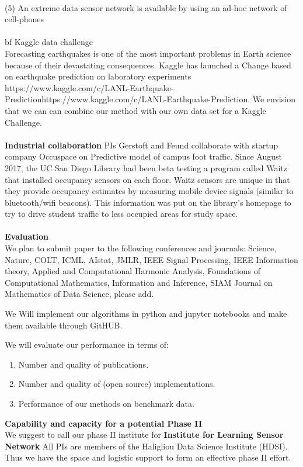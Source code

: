 \documentclass{article}
\begin{document}
\\
(5) An extreme data sensor network is available by using an ad-hoc network of cell-phones
\\
\\
{bf Kaggle data challenge}\\
Forecasting earthquakes is one of the most important problems in Earth science because of their devastating consequences. Kaggle has launched a Change based on earthquake prediction on laboratory experiments {https://www.kaggle.com/c/LANL-Earthquake-Prediction}{https://www.kaggle.com/c/LANL-Earthquake-Prediction}. We envision that we can can combine our method with our own data set for a Kaggle Challenge.  
\\
\\
{\bf Industrial collaboration}
PIs Gerstoft and Feund collaborate with startup company  Occuspace on
Predictive model of campus foot traffic. Since August 2017, the UC San Diego Library had been beta testing a program called Waitz that installed occupancy sensors on each floor. Waitz sensors are unique in that they provide occupancy estimates by measuring mobile device signals (similar to bluetooth/wifi beacons). This information was put on the library’s homepage to try to drive student traffic to less occupied areas for study space. 
\\
\\
{\bf Evaluation}\\
We plan to submit paper to the following conferences and journals:
Science, Nature, COLT, ICML, AIstat, JMLR, IEEE Signal Processing, IEEE Information
theory, Applied and Computational Harmonic Analysis, Foundations of Computational Mathematics, Information and Inference, SIAM Journal on Mathematics of Data Science, please add.

We Will implement our algorithms in python and jupyter notebooks and
make them available through GitHUB.


We will evaluate our performance in terms of:
\begin{enumerate}
\item Number and quality of publications.
\item Number  and quality of (open source) implementations.
\item Performance of our methods on benchmark data.
\end{enumerate}

\vspace{1cm}
{\bf Capability and capacity for a potential Phase II}\\
We suggest to call our phase II institute for {\bf Institute for  Learning Sensor Network}
All PIs are members of the Haligliou Data Science Institute (HDSI). Thus we have the space and logistic support to form an effective phase II effort.
\end{document}
